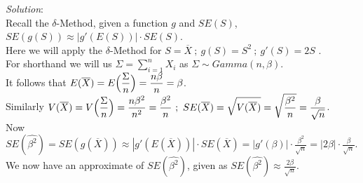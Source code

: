 \documentclass[12pt]{article}
\begin{document}
\textit{Solution}:
\vspace{2.5mm} \\

\noindent 
Recall the $ \delta $-Method, given a function $ g $ and $ SE(S) $, $ SE(g(S)) \approx |g'(E(S))| \cdot SE(S) $. \\

\noindent
Here we will apply the $ \delta $-Method for $ S = \overline{X} \ ; \ g(S) = S^{2} \ ; \ g'(S) = 2S $ . \\

\noindent
For shorthand we will us $ \displaystyle \Sigma = \sum_{i=1}^{n} X_{i} $ as $ \Sigma \sim Gamma(n, \beta) $. \\ 

\noindent
It follows that $ \displaystyle E(\overline{X}) = E\Bigl( \frac{\Sigma}{n} \Bigr) = \frac{n\beta}{n} = \beta $. \\

\noindent
Similarly $ \displaystyle V(\overline{X}) = V\Bigl( \frac{\Sigma}{n} \Bigr) = \frac{n\beta^{2}}{n^{2}} = \frac{\beta^{2}}{n} \ ; \ SE(\overline{X}) = \sqrt{V(\overline{X})} = \sqrt{\frac{\beta^{2}}{n}} = \frac{\beta}{\sqrt{n}} $. \\

\noindent
Now $ \displaystyle SE(\hat{\beta^{2}}) = SE(g(\overline{X})) \approx |g'(E(\overline{X}))| \cdot SE(\overline{X}) = |g'(\beta)| \cdot \frac{\beta^{2}}{\sqrt{n}} = |2\beta| \cdot \frac{\beta}{\sqrt{n}}  $. \\

\noindent
We now have an approximate of $ SE(\hat{\beta^{2}}) $, given as $ \displaystyle SE(\hat{\beta^{2}}) \approx \frac{2\beta}{\sqrt{n}} $. \\
\end{document}
